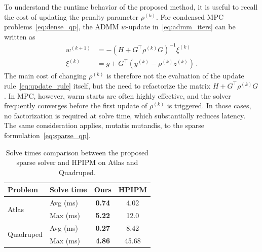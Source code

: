\documentclass[letterpaper, 10 pt, conference]{ieeeconf}  %
\begin{document}
To understand the runtime behavior of the proposed method, it is useful to recall the cost of updating the penalty parameter \(\rho^{(k)}\). For condensed MPC problems~\eqref{eq:dense_qp}, the ADMM \(w\)-update in~\eqref{eq:admm_iters} can be written as
\begin{equation}
\begin{aligned}
w^{(k+1)} &= - \left(H + G^{\top} \rho^{(k)} G \right)^{-1} \xi^{(k)} \\
\xi^{(k)} &= g + G^{\top} \left(y^{(k)} - \rho^{(k)} z^{(k)}\right) \,.
\end{aligned}
\end{equation}
The main cost of changing \(\rho^{(k)}\) is therefore not the evaluation of the update rule~\eqref{eq:update_rule} itself, but the need to refactorize the matrix \(H + G^{\top} \rho^{(k)} G\). In MPC, however, warm starts are often highly effective, and the solver frequently converges before the first update of \(\rho^{(k)}\) is triggered. In those cases, no factorization is required at solve time, which substantially reduces latency. The same consideration applies, mutatis mutandis, to the sparse formulation~\eqref{eq:sparse_qp}.

\begin{table}
\centering
\begin{tabular}{llcc}
\toprule
Problem & Solve time & Ours & HPIPM \\
\midrule
\multirow{2}{*}{Atlas} 
    & Avg (ms) & \textbf{0.74} & 4.02 \\
    & Max (ms) & \textbf{5.22} & 12.0 \\
\midrule
\multirow{2}{*}{Quadruped} 
    & Avg (ms) & \textbf{0.27} & 8.42 \\
    & Max (ms) & \textbf{4.86} & 45.68 \\
\bottomrule
\end{tabular}
\caption{Solve times comparison between the proposed sparse solver and HPIPM on Atlas and Quadruped.}
\label{tab:riccati_based_solve_times}
\end{table}
\end{document}

